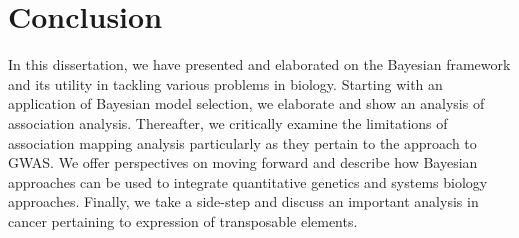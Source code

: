 \chapter{Conclusion}
\label{cha:conclusion}

In this dissertation, we have presented and elaborated on the  Bayesian framework and its utility in tackling various problems in biology. Starting with an application of Bayesian model selection, we elaborate and show an analysis of association analysis. Thereafter, we critically examine the limitations of association mapping analysis particularly as they pertain to the approach to GWAS. We offer perspectives on moving forward and describe how Bayesian approaches can be used to integrate quantitative genetics and systems biology approaches. Finally, we take a side-step and discuss an important analysis in cancer pertaining to expression of transposable elements. 

